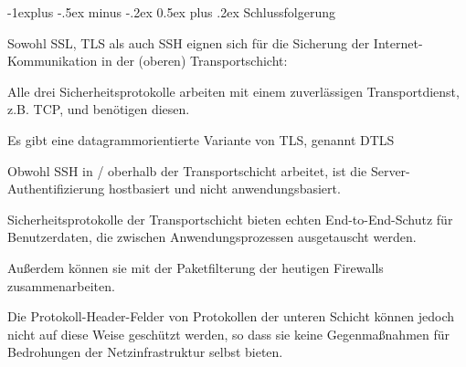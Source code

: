 \documentclass[a4paper]{article}
\makeatletter
\renewcommand{\subsection}{\@startsection{subsection}{2}{0mm}%
 {-1explus -.5ex minus -.2ex}%
 {0.5ex plus .2ex}%
 {\normalfont\normalsize\bfseries}}
\makeatother
\begin{document}
\begin{multicols}{3}
      \subsection{Schlussfolgerung}
      \begin{itemize*}
            \item Sowohl SSL, TLS als auch SSH eignen sich für die Sicherung der Internet-Kommunikation in der (oberen) Transportschicht:
            \begin{itemize*}
                  \item Alle drei Sicherheitsprotokolle arbeiten mit einem zuverlässigen Transportdienst, z.B. TCP, und benötigen diesen.
                  \item Es gibt eine datagrammorientierte Variante von TLS, genannt DTLS
                  \item Obwohl SSH in / oberhalb der Transportschicht arbeitet, ist die Server-Authentifizierung hostbasiert und nicht anwendungsbasiert.
                  \item Sicherheitsprotokolle der Transportschicht bieten echten End-to-End-Schutz für Benutzerdaten, die zwischen Anwendungsprozessen ausgetauscht werden.
                  \item Außerdem können sie mit der Paketfilterung der heutigen Firewalls zusammenarbeiten.
                  \item Die Protokoll-Header-Felder von Protokollen der unteren Schicht können jedoch nicht auf diese Weise geschützt werden, so dass sie keine Gegenmaßnahmen für Bedrohungen der Netzinfrastruktur selbst bieten.
            \end{itemize*}
      \end{itemize*}


\end{multicols}
\end{document}
